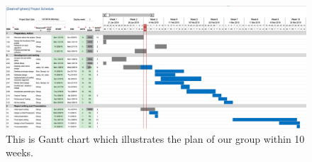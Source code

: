 \documentclass[10.25pt,a4paper,oneside]{article}
\begin{document}
\begin{figure}
\includegraphics[scale=0.4]{Timeline_Ver_0}
\caption{This is Gantt chart which illustrates the plan of our group within 10 weeks.}
\end{figure}
\end{document}
